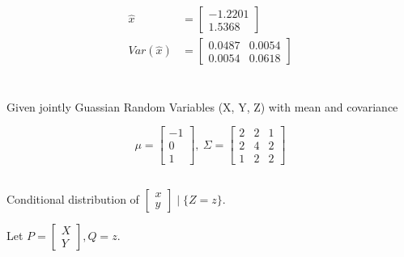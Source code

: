 \documentclass{article}
\theoremstyle{definition} %
\begin{document}
\subsection{}

\begin{align*}
    \hat x &= 
    \begin{bmatrix}
        -1.2201\\
        1.5368
    \end{bmatrix}\\
    Var(\hat x) &=
    \begin{bmatrix}
        0.0487&0.0054\\
        0.0054&0.0618
    \end{bmatrix}
\end{align*}

\section{}
Given jointly Guassian Random Variables (X, Y, Z) with mean and covariance

$$
\mu = 
\begin{bmatrix}
    -1\\ 0\\ 1   
\end{bmatrix},
\ 
\Sigma = 
\begin{bmatrix}
    2 & 2 & 1\\
    2 & 4 & 2\\
    1 & 2 & 2
\end{bmatrix}
$$

\subsection{}\label{sec-2-1}

Conditional distribution of $\left[\begin{array}{c}x \\ y\end{array}\right] \mid\{Z=z\}$.

Let $P=\left[\begin{array}{l}X \\ Y\end{array}\right], Q=z$.
\end{document}
